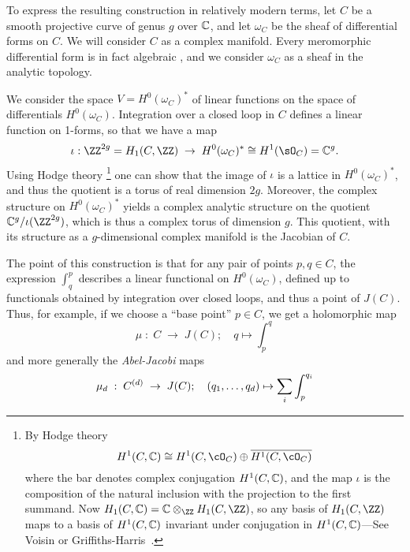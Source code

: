 To express the resulting construction in relatively modern terms, let $C$ be a smooth projective curve of genus $g$ over $\CC$, and let $\omega_{C}$ be the sheaf of differential forms on $C$. We will consider $C$ as a complex manifold. Every meromorphic differential form is in fact algebraic
\cite{****}, and we consider $\omega_{C}$ as a sheaf in the analytic topology.

We consider the space $V = H^0(\omega_C)^*$ of linear functions on the space of differentials $H^0(\omega_C)$.  Integration over a closed loop in $C$ defines a linear function on 1-forms, so that we have a map
$$
\iota: \ZZ^{2g} = H_1(C,\ZZ) \; \to \;  H^0(\omega_C)^* \cong H^1(\sO_C) = \CC^{g}.
$$
Using  Hodge theory
\footnote{By Hodge theory 
$$
H^1(C, \CC) \cong H^1(C, \cO_C) \oplus \overline{H^1(C, \cO_C)}
$$
where the bar denotes complex conjugation $H^1(C, \CC)$, and the map $\iota$ is the composition of 
 the natural inclusion with the projection to the first summand.
 Now
$H_1(C,\CC) = \CC\otimes_\ZZ H_1(C,\ZZ)$, so any basis of $H_1(C,\ZZ)$ maps to a basis of 
 $H^1(C, \CC)$ invariant under conjugation in $H^1(C, \CC)$---See Voisin \cite{} or Griffiths-Harris~\cite{}. 
}
one can show that the image of $\iota$ is a lattice in $H^0(\omega_C)^*$, and thus the quotient
is a torus of real dimension $2g$. Moreover, the
complex structure on $H^0(\omega_C)^*$ yields a complex analytic structure on the quotient $\CC^{g}/\iota(\ZZ^{2g})$, which is thus a complex torus of  dimension $g$.  This quotient, with its structure as a $g$-dimensional complex manifold is the Jacobian of $C$.

The point of this construction is that for any pair of points $p, q \in C$, the expression $\int_q^p$ describes a linear functional on $H^0(\omega_C)$, defined up to functionals obtained by integration over closed loops, and thus a point of $J(C)$. Thus, for example, if we choose a ``base point''  $p\in C$, we get a holomorphic map
$$
\mu \; : \; C \; \to \; J(C); \quad q\mapsto \int_{p}^{q}
$$
and more generally the \emph{Abel-Jacobi} maps
$$
\mu_d \; : \; \Cd \; \to \; J(C); \quad (q_1,\dots, q_d) \mapsto \sum_i \int_{p}^{q_i}
$$

